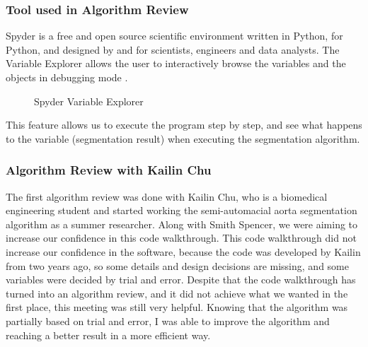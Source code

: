 \subsubsection{Tool used in Algorithm Review}

Spyder is a free and open source scientific environment written in Python, for Python, and designed by and for scientists, engineers and data analysts. The Variable Explorer allows the user to interactively browse the variables and the objects in debugging mode \cite{Spyder}
.
\begin{figure}[H]
    \centering
    \caption[Spyder Variable Explorer]{Spyder Variable Explorer \cite{raybaut2009spyder}}
    \label{fig_spyder_ve}
\end{figure}

This feature allows us to execute the program step by step, and see what happens to the variable (segmentation result) when executing the segmentation algorithm. 


\subsubsection{Algorithm Review with Kailin Chu}
The first algorithm review was done with Kailin Chu, who is a biomedical engineering student and started working the semi-automacial aorta segmentation algorithm as a summer researcher. Along with Smith Spencer, we were aiming to increase our confidence in this code walkthrough. This code walkthrough did not increase our confidence in the software, because the code was developed by Kailin from two years ago, so some details and design decisions are missing, and some variables were decided by trial and error. Despite that the code walkthrough has turned into an algorithm review, and it did not achieve what we wanted in the first place, this meeting was still very helpful. Knowing that the algorithm was partially based on trial and error, I was able to improve the algorithm and reaching a better result in a more efficient way.

